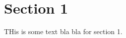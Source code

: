 \documentclass[../main.tex]{subfiles}
\begin{document}
\section{Section 1}
THis is some text bla bla for section 1. \newline
\end{document}

